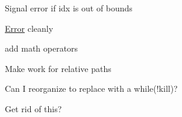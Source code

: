 \begin{DoxyRefList}
Signal error if idx is out of bounds  
\item[\label{todo__todo000023}%
\Hypertarget{todo__todo000023}%
Member \hyperlink{classnta_1_1utils_1_1Json_a905d67b125a7aadd771bb74a1bb63f34}{nta\+:\+:utils\+:\+:Json\+:\+:tokenize} (std\+::string curr)]\hyperlink{structnta_1_1Error}{Error} cleanly  
\item[\label{todo__todo000005}%
\Hypertarget{todo__todo000005}%
Class \hyperlink{classnta_1_1utils_1_1JsonNum}{nta\+:\+:utils\+:\+:Json\+Num} ]add math operators 
\item[\label{todo__todo000025}%
\Hypertarget{todo__todo000025}%
Member \hyperlink{classnta_1_1utils_1_1Path_aa124dc05466b3f681d02579fa0022a6a}{nta\+:\+:utils\+:\+:Path\+:\+:parent} () const]Make work for relative paths  
\item[\label{todo__todo000029}%
\Hypertarget{todo__todo000029}%
Member \hyperlink{classnta_1_1utils_1_1ThreadPool_a2ca98ba5ed4510e5aac90c0507859b8d}{nta\+:\+:utils\+:\+:Thread\+Pool\+:\+:dispatcher} ()]Can I reorganize to replace with a while(!kill)?  
\item[\label{todo__todo000031}%
\Hypertarget{todo__todo000031}%
Member \hyperlink{classnta_1_1Window_aa144f6bb014aaad3c91c3f3e6ad56f9c}{nta\+:\+:Window\+:\+:screenshot} () const]Get rid of this? 
\end{DoxyRefList}